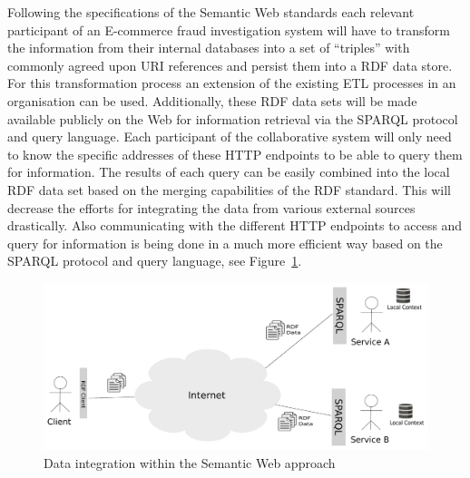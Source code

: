 Following the specifications of the Semantic Web standards each relevant participant of an \gls{E-commerce} fraud investigation system will have to transform the information from their internal databases into a set of ``triples'' with commonly agreed upon \gls{URI} references and persist them into a \gls{RDF} data store. For this transformation process an extension of the existing \gls{ETL} processes in an organisation can be used. Additionally, these \gls{RDF} data sets will be made available publicly on the Web for information retrieval via the \gls{SPARQL} protocol and query language. Each participant of the collaborative system will only need to know the specific addresses of these \gls{HTTP} endpoints to be able to query them for information. The results of each query can be easily combined into the local \gls{RDF} data set based on the merging capabilities of the \gls{RDF} standard. This will decrease the efforts for integrating the data from various external sources drastically. Also communicating with the different \gls{HTTP} endpoints to access and query for information is being done in a much more efficient way based on the \gls{SPARQL} protocol and query language, see Figure~\ref{fig:web_data_scenario}. \@

\begin{figure}[H]
  \centering
  \includegraphics[width=0.9\columnwidth]{images/web-data-scenario.pdf}
  \caption{Data integration within the Semantic Web approach}
\label{fig:web_data_scenario}
\end{figure}

